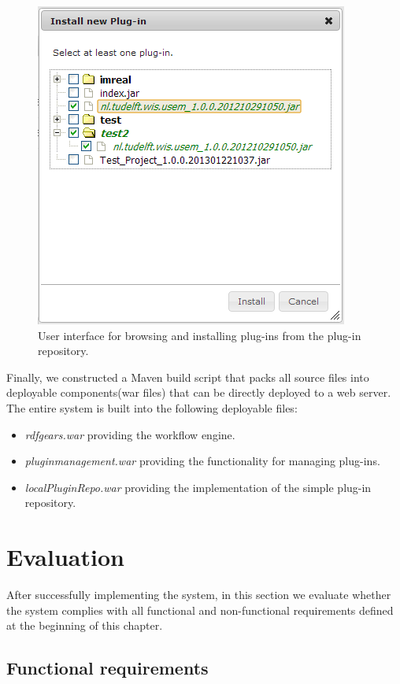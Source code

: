 \begin{figure}[h!]
  \centering
  	\includegraphics[scale=0.6]{plug-in/ui/repo.png}
  \caption{User interface for browsing and installing plug-ins from the plug-in repository.}
  \label{repo_ui}
\end{figure}

Finally, we constructed a Maven build script that packs all source files into deployable components(war files) that can be directly deployed to a web server. The entire system is built into the following deployable files:
\begin{itemize}
	\item \textit{rdfgears.war} providing the workflow engine.
	\item \textit{pluginmanagement.war} providing the functionality for managing plug-ins.
	\item \textit{localPluginRepo.war} providing the implementation of the simple plug-in repository.
\end{itemize}

\section{Evaluation}
\label{sec:evalPlugin}

After successfully implementing the system, in this section we evaluate whether the system complies with all functional and non-functional requirements defined at the beginning of this chapter. 

\subsection{Functional requirements}

